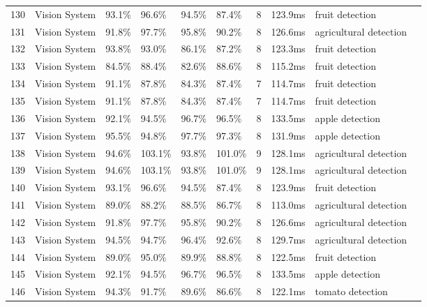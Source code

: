 \begin{table*}[htbp]
\begin{tabular}{p{}p{}p{}p{}p{}p{}p{}p{}p{}p{}}
 130 & Vision System & 93.1\% & 96.6\% & 94.5\% & 87.4\% & 8 & 123.9ms & fruit detection & \cite{xiang2019fruit} \\
 131 & Vision System & 91.8\% & 97.7\% & 95.8\% & 90.2\% & 8 & 126.6ms & agricultural detection & \cite{horng2019smart} \\
 132 & Vision System & 93.8\% & 93.0\% & 86.1\% & 87.2\% & 8 & 123.3ms & fruit detection & \cite{wang2017robust} \\
 133 & Vision System & 84.5\% & 88.4\% & 82.6\% & 88.6\% & 8 & 115.2ms & fruit detection & \cite{lu2015detecting} \\
 134 & Vision System & 91.1\% & 87.8\% & 84.3\% & 87.4\% & 7 & 114.7ms & fruit detection & \cite{hemming2014fruit} \\
 135 & Vision System & 91.1\% & 87.8\% & 84.3\% & 87.4\% & 7 & 114.7ms & fruit detection & \cite{cubero2014optimised} \\
 136 & Vision System & 92.1\% & 94.5\% & 96.7\% & 96.5\% & 8 & 133.5ms & apple detection & \cite{liu2016method} \\
 137 & Vision System & 95.5\% & 94.8\% & 97.7\% & 97.3\% & 8 & 131.9ms & apple detection & \cite{silwal2017design} \\
 138 & Vision System & 94.6\% & 103.1\% & 93.8\% & 101.0\% & 9 & 128.1ms & agricultural detection & \cite{arad2020development} \\
 139 & Vision System & 94.6\% & 103.1\% & 93.8\% & 101.0\% & 9 & 128.1ms & agricultural detection & \cite{xiong2020autonomous} \\
 140 & Vision System & 93.1\% & 96.6\% & 94.5\% & 87.4\% & 8 & 123.9ms & fruit detection & \cite{williams2019robotic} \\
 141 & Vision System & 89.0\% & 88.2\% & 88.5\% & 86.7\% & 8 & 113.0ms & agricultural detection & \cite{mehta2014vision} \\
 142 & Vision System & 91.8\% & 97.7\% & 95.8\% & 90.2\% & 8 & 126.6ms & agricultural detection & \cite{xiong2019development} \\
 143 & Vision System & 94.5\% & 94.7\% & 96.4\% & 92.6\% & 8 & 129.7ms & agricultural detection & \cite{lehnert2017autonomous} \\
 144 & Vision System & 89.0\% & 95.0\% & 89.9\% & 88.8\% & 8 & 122.5ms & fruit detection & \cite{underwood2016mapping} \\
 145 & Vision System & 92.1\% & 94.5\% & 96.7\% & 96.5\% & 8 & 133.5ms & apple detection & \cite{nguyen2016detection} \\
 146 & Vision System & 94.3\% & 91.7\% & 89.6\% & 86.6\% & 8 & 122.1ms & tomato detection & \cite{yaguchi2016development} \\

\end{tabular}
\end{table*}
